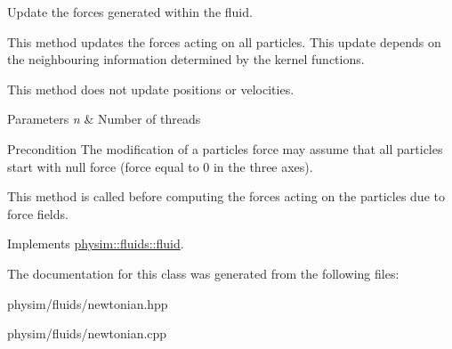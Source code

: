 Update the forces generated within the fluid. 

This method updates the forces acting on all particles. This update depends on the neighbouring information determined by the kernel functions.

This method does not update positions or velocities.


\begin{DoxyParams}{Parameters}
{\em n} & Number of threads \\
\hline
\end{DoxyParams}
\begin{DoxyPrecond}{Precondition}
The modification of a particles\textquotesingle{} force may assume that all particles start with null force (force equal to 0 in the three axes). 

This method is called before computing the forces acting on the particles due to force fields. 
\end{DoxyPrecond}


Implements \hyperlink{classphysim_1_1fluids_1_1fluid_a08fe6b6111608b3deb3c3ddd84e1ab32}{physim\+::fluids\+::fluid}.



The documentation for this class was generated from the following files\+:\begin{DoxyCompactItemize}
\item 
physim/fluids/newtonian.\+hpp\item 
physim/fluids/newtonian.\+cpp\end{DoxyCompactItemize}
